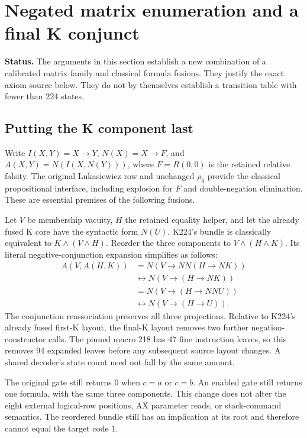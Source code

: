 \section{Negated matrix enumeration and a final K conjunct}
\label{sec:polarity-corelast}

\noindent\textbf{Status.} The arguments in this section establish a new
combination of a calibrated matrix family and classical formula fusions.
They justify the exact axiom source below.  They do not by themselves
establish a transition table with fewer than 224 states.

\subsection{Putting the K component last}

Write $I(X,Y)=X\to Y$, $N(X)=X\to F$, and
$A(X,Y)=N(I(X,N(Y)))$, where $F=R(0,0)$ is the retained relative falsity.
The original Lukasiewicz row and unchanged $\rho_6$ provide the classical
propositional interface, including explosion for $F$ and double-negation
elimination.  These are essential premises of the following fusions.

Let $V$ be membership vacuity, $H$ the retained equality helper, and let
the already fused K core have the syntactic form $N(U)$.  K224's bundle
is classically equivalent to $K\wedge(V\wedge H)$.  Reorder the three
components to $V\wedge(H\wedge K)$.  Its literal negative-conjunction
expansion simplifies as follows:
\begin{align*}
 A(V,A(H,K))
 &=N\!\left(V\to NN\!\left(H\to NK\right)\right)\\
 &\leftrightarrow N\!\left(V\to\left(H\to NK\right)\right)\\
 &=N\!\left(V\to\left(H\to NN U\right)\right)\\
 &\leftrightarrow N\!\left(V\to(H\to U)\right).
\end{align*}
The conjunction reassociation preserves all three projections.  Relative
to K224's already fused first-K layout, the final-K layout removes two
further negation-constructor calls.  The pinned macro 218 has 47 fine
instruction leaves, so this removes 94 expanded leaves before any
subsequent source layout changes.  A shared decoder's state count need
not fall by the same amount.

The original gate still returns $0$ when $c=a$ or $c=b$.  An enabled gate
still returns one formula, with the same three components.  This change
does not alter the eight external logical-row positions, AX parameter
reads, or stack-command semantics.  The reordered bundle still has an
implication at its root and therefore cannot equal the target code $1$.

